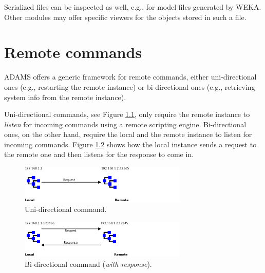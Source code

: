 Serialized files can be inspected as well, e.g., for model files generated 
by WEKA. Other modules may offer specific viewers for the objects stored
in such a file.


\chapter{Remote commands}

ADAMS offers a generic framework for remote commands, either uni-directional
ones (e.g., restarting the remote instance) or bi-directional ones
(e.g., retrieving system info from the remote instance).

Uni-directional commands, see Figure \ref{remote_command-uni_directional},
only require the remote instance to \textit{listen} for incoming commands
using a remote scripting engine. Bi-directional ones, on the other hand,
require the local and the remote instance to listen for incoming commands.
Figure \ref{remote_command-bi_directional} shows how the local instance
sends a request to the remote one and then listens for the response to
come in.

\begin{figure}[htb]
  \centering
  \includegraphics[width=8.0cm]{images/remote_command-uni_directional.png}
  \caption{Uni-directional command.}
  \label{remote_command-uni_directional}
\end{figure}

\begin{figure}[htb]
  \centering
  \includegraphics[width=8.0cm]{images/remote_command-bi_directional.png}
  \caption{Bi-directional command (\textit{with response}).}
  \label{remote_command-bi_directional}
\end{figure}

